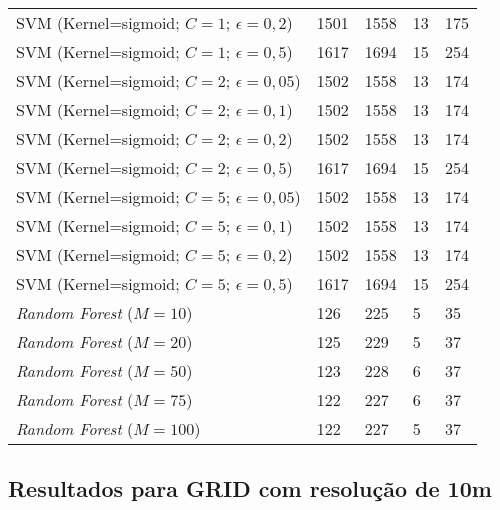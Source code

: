 \begin{center}
\begin{longtable}{|l|l|l|l|l|}
SVM (Kernel=sigmoid; $C=1$; $\epsilon=0,2$) & 1501 & 1558 & 13 & 175 \\
SVM (Kernel=sigmoid; $C=1$; $\epsilon=0,5$) & 1617 & 1694 & 15 & 254 \\
SVM (Kernel=sigmoid; $C=2$; $\epsilon=0,05$) & 1502 & 1558 & 13 & 174 \\
SVM (Kernel=sigmoid; $C=2$; $\epsilon=0,1$) & 1502 & 1558 & 13 & 174 \\
SVM (Kernel=sigmoid; $C=2$; $\epsilon=0,2$) & 1502 & 1558 & 13 & 174 \\
SVM (Kernel=sigmoid; $C=2$; $\epsilon=0,5$) & 1617 & 1694 & 15 & 254 \\
SVM (Kernel=sigmoid; $C=5$; $\epsilon=0,05$) & 1502 & 1558 & 13 & 174 \\
SVM (Kernel=sigmoid; $C=5$; $\epsilon=0,1$) & 1502 & 1558 & 13 & 174 \\
SVM (Kernel=sigmoid; $C=5$; $\epsilon=0,2$) & 1502 & 1558 & 13 & 174 \\
SVM (Kernel=sigmoid; $C=5$; $\epsilon=0,5$) & 1617 & 1694 & 15 & 254 \\
\textit{Random Forest} ($M=10$) & 126 & 225 & 5 & 35 \\
\textit{Random Forest} ($M=20$) & 125 & 229 & 5 & 37 \\
\textit{Random Forest} ($M=50$) & 123 & 228 & 6 & 37 \\
\textit{Random Forest} ($M=75$) & 122 & 227 & 6 & 37 \\
\textit{Random Forest} ($M=100$) & 122 & 227 & 5 & 37 \\
\end{longtable}
\end{center}


\subsection{Resultados para GRID com resolução de 10m}
\label{appendix:fulltable10m}

